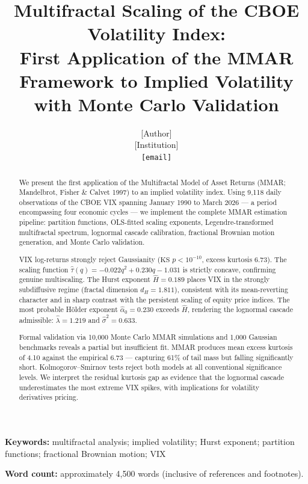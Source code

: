 \documentclass[12pt,a4paper]{article}
\title{\textbf{Multifractal Scaling of the CBOE Volatility Index:\\
First Application of the MMAR Framework to Implied Volatility\\
with Monte Carlo Validation}}
\author{[Author]\\
\small [Institution]\\
\small \texttt{[email]}}
\date{}
\begin{document}
\maketitle

\begin{abstract}
We present the first application of the Multifractal Model of Asset
Returns (MMAR; Mandelbrot, Fisher \& Calvet 1997) to an implied
volatility index. Using 9,118 daily observations of the CBOE VIX
spanning January 1990 to March 2026 --- a period encompassing four
economic cycles --- we implement the complete MMAR estimation pipeline:
partition functions, OLS-fitted scaling exponents, Legendre-transformed
multifractal spectrum, lognormal cascade calibration, fractional
Brownian motion generation, and Monte Carlo validation.

VIX log-returns strongly reject Gaussianity ($\text{KS } p < 10^{-10}$,
excess kurtosis 6.73). The scaling function
$\hat{\tau}(q) = -0.022q^2 + 0.230q - 1.031$ is strictly concave,
confirming genuine multiscaling. The Hurst exponent $\hat{H} = 0.189$
places VIX in the strongly subdiffusive regime (fractal dimension
$d_H = 1.811$), consistent with its mean-reverting character and in
sharp contrast with the persistent scaling of equity price indices.
The most probable H\"{o}lder exponent $\hat{\alpha}_0 = 0.230$
exceeds $\hat{H}$, rendering the lognormal cascade admissible:
$\hat{\lambda} = 1.219$ and $\hat{\sigma}^2 = 0.633$.

Formal validation via 10,000 Monte Carlo MMAR simulations and 1,000
Gaussian benchmarks reveals a partial but insufficient fit. MMAR
produces mean excess kurtosis of 4.10 against the empirical 6.73 ---
capturing 61\% of tail mass but falling significantly short.
Kolmogorov--Smirnov tests reject both models at all conventional
significance levels. We interpret the residual kurtosis gap as
evidence that the lognormal cascade underestimates the most extreme
VIX spikes, with implications for volatility derivatives pricing.
\end{abstract}

\medskip
\noindent\textbf{Keywords:} multifractal analysis; implied volatility;
Hurst exponent; partition functions; fractional Brownian motion; VIX

\medskip
\noindent\textbf{Word count:} approximately 4{,}500 words (inclusive of references and footnotes).
\end{document}
